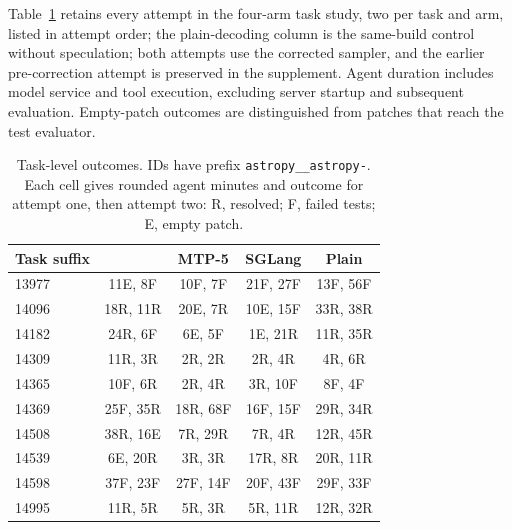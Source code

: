 Table~\ref{tab:swe-tasks} retains every attempt in the four-arm task study, two per task and arm, listed in attempt order; the plain-decoding column is the same-build control without speculation; both \sys{} attempts use the corrected sampler, and the earlier pre-correction attempt is preserved in the supplement. Agent duration includes model service and tool execution, excluding server startup and subsequent evaluation. Empty-patch outcomes are distinguished from patches that reach the test evaluator.

\begin{table}[!htbp]
\caption{Task-level outcomes. IDs have prefix \texttt{astropy\_\_astropy-}. Each cell gives rounded agent minutes and outcome for attempt one, then attempt two: R, resolved; F, failed tests; E, empty patch.}
\label{tab:swe-tasks}
\centering\footnotesize
\begin{tabular}{@{}lcccc@{}}
\toprule
Task suffix & \sys{} & MTP-5 & SGLang & Plain \\
\midrule
13977 & 11E, 8F & 10F, 7F & 21F, 27F & 13F, 56F \\
14096 & 18R, 11R & 20E, 7R & 10E, 15F & 33R, 38R \\
14182 & 24R, 6F & 6E, 5F & 1E, 21R & 11R, 35R \\
14309 & 11R, 3R & 2R, 2R & 2R, 4R & 4R, 6R \\
14365 & 10F, 6R & 2R, 4R & 3R, 10F & 8F, 4F \\
14369 & 25F, 35R & 18R, 68F & 16F, 15F & 29R, 34R \\
14508 & 38R, 16E & 7R, 29R & 7R, 4R & 12R, 45R \\
14539 & 6E, 20R & 3R, 3R & 17R, 8R & 20R, 11R \\
14598 & 37F, 23F & 27F, 14F & 20F, 43F & 29F, 33F \\
14995 & 11R, 5R & 5R, 3R & 5R, 11R & 12R, 32R \\
\bottomrule
\end{tabular}
\end{table}
